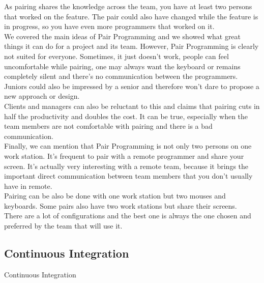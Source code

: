 As pairing shares the knowledge across the team, you have at least two
persons that worked on the feature.
The pair could also have changed while the feature is in progress, so you
have even more programmers that worked on it. \\
\newline
We covered the main ideas of Pair Programming and we showed what great
things it can do for a project and its team.
However, Pair Programming is clearly not suited for everyone.
Sometimes, it just doesn't work, people can feel uncomfortable while
pairing, one may always want the keyboard or remains completely
silent and there's no communication between the programmers.
Juniors could also be impressed by a senior and therefore won't dare to
propose a new approach or design. \\
Clients and managers can also be reluctant to this and claims that
pairing cuts in half the productivity and doubles the cost.
It can be true, especially when the team members are not comfortable with
pairing and there is a bad communication. \\
\newline
Finally, we can mention that Pair Programming is not only two persons on
one work station.
It's frequent to pair with a remote programmer and share your screen.
It's actually very interesting with a remote team, because it brings the
important direct communication between team members that you don't
usually have in remote. \\
Pairing can be also be done with one work station but two mouses and
keyboards.
Some pairs also have two work stations but share their screens. \\
There are a lot of configurations and the best one is always the one
chosen and preferred by the team that will use it.

\subsection{Continuous Integration}\label{subsec:continuous-integration}
Continuous Integration
